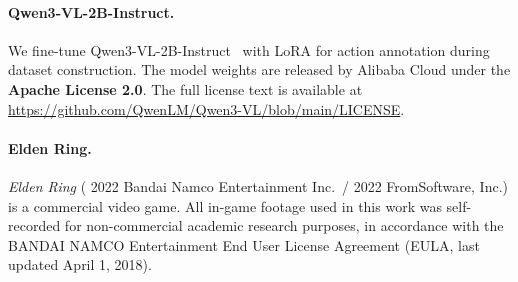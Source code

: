 \paragraph{Qwen3-VL-2B-Instruct.}
We fine-tune Qwen3-VL-2B-Instruct~\citep{bai2025qwen3} with LoRA for action annotation during dataset construction.
The model weights are released by Alibaba Cloud under the \textbf{Apache License 2.0}.
The full license text is available at \url{https://github.com/QwenLM/Qwen3-VL/blob/main/LICENSE}.

\paragraph{Elden Ring.}
\textit{Elden Ring} (\textcopyright{} 2022 Bandai Namco Entertainment Inc.\ / \textcopyright{} 2022 FromSoftware, Inc.) is a commercial video game.
All in-game footage used in this work was self-recorded for non-commercial academic research purposes, in accordance with the BANDAI NAMCO Entertainment End User License Agreement (EULA, last updated April 1, 2018).






